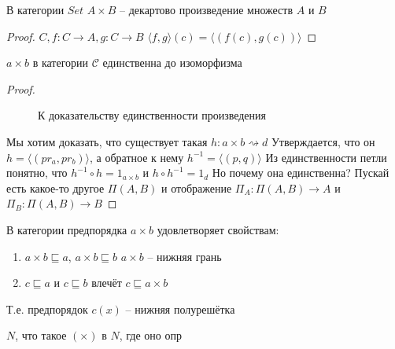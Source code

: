 \begin{stmt}
  В категории $Set$ $A \times B$ -- декартово произведение множеств $A$ и $B$
\end{stmt}
\begin{proof}
  $C, f \colon C \to A, g \colon C \to B$
  $\langle f, g \rangle (c) = \langle (f(c), g(c)) \rangle$
\end{proof}

\begin{stmt}
  $a \times b$ в категории $\mathcal{C}$ единственна до изоморфизма
\end{stmt}
\begin{proof}
  \begin{figure}[h]
    \centering
    \caption{К доказательству единственности произведения}
    \label{fig:multiplication-uniqueness}
  \end{figure}
  Мы хотим доказать, что существует такая $h \colon a \times b \rightsquigarrow d$
  Утверждается, что он $h = \langle (pr_a, pr_b) \rangle$, а обратное к нему $h^{-1}
  = \langle (p, q) \rangle$
  Из единственности петли понятно, что $h^{-1} \circ h = 1_{a \times b}$ и $h
  \circ h^{-1} = 1_d$
  Но почему она единственна? Пускай есть какое-то другое $\Pi(A, B)$ и отображение
  $\Pi_A \colon \Pi(A, B) \to A$ и $\Pi_B \colon \Pi(A, B) \to B$
\end{proof}

\begin{task}
  В категории предпорядка
  $a \times b$ удовлетворяет свойствам:
  \begin{enumerate}
  \item $a \times b \sqsubseteq a$, $a \times b \sqsubseteq b$
      $a \times b$ -- нижняя грань
    \item $c \sqsubseteq a$ и $c \sqsubseteq b$ влечёт $c \sqsubseteq a \times b$
  \end{enumerate}
  Т.е. предпорядок $c (x)$ -- нижняя полурешётка
\end{task}

\begin{task}
  $N$, что такое $(\times)$ в $N$, где оно опр
\end{task}

